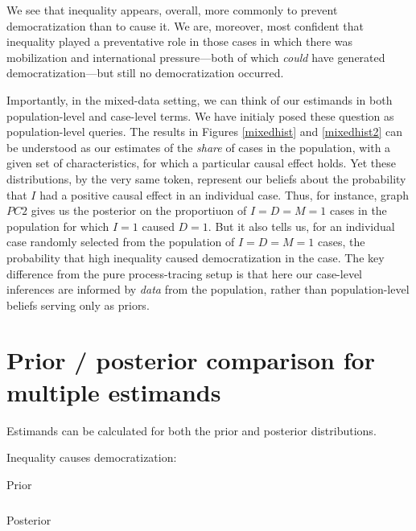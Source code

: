 \documentclass[
  12pt,
]{book}
\begin{document}
We see that inequality appears, overall, more commonly to prevent democratization than to cause it. We are, moreover, most confident that inequality played a preventative role in those cases in which there was mobilization and international pressure---both of which \emph{could} have generated democratization---but still no democratization occurred.

Importantly, in the mixed-data setting, we can think of our estimands in both population-level and case-level terms. We have initialy posed these question as population-level queries. The results in Figures \ref{mixedhist} and \ref{mixedhist2} can be understood as our estimates of the \emph{share} of cases in the population, with a given set of characteristics, for which a particular causal effect holds. Yet these distributions, by the very same token, represent our beliefs about the probability that \(I\) had a positive causal effect in an individual case. Thus, for instance, graph \(PC2\) gives us the posterior on the proportiuon of \(I=D=M=1\) cases in the population for which \(I=1\) caused \(D=1\). But it also tells us, for an individual case randomly selected from the population of \(I=D=M=1\) cases, the probability that high inequality caused democratization in the case. The key difference from the pure process-tracing setup is that here our case-level inferences are informed by \emph{data} from the population, rather than population-level beliefs serving only as priors.

\hypertarget{prior-posterior-comparison-for-multiple-estimands}{%
\section{Prior / posterior comparison for multiple estimands}\label{prior-posterior-comparison-for-multiple-estimands}}

Estimands can be calculated for both the prior and posterior distributions.

Inequality causes democratization:

\begin{table}

\caption{\label{tab:IcausesDem}Prior}
\centering
\begin{tabular}[t]{}
\hline

\hline
\end{tabular}
\end{table}

\begin{table}

\caption{\label{tab:IcausesDem}Posterior}
\centering
\begin{tabular}[t]{}
\hline

\hline
\end{tabular}
\end{table}
\end{document}
